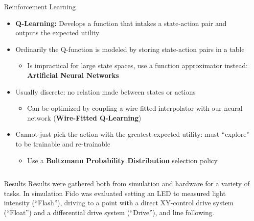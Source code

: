 \documentclass[final]{beamer}
\newlength{\onecolwid}
\newlength{\twocolwid}
\begin{document}
\begin{frame}[t]
\begin{columns}[t]
\begin{column}{\twocolwid}
\begin{columns}[t,totalwidth=\twocolwid]
\begin{column}{\onecolwid}\begin{block}{Reinforcement Learning}
	\begin{itemize}
		\item \textbf{Q-Learning:} Develops a function that intakes a state-action pair and outputs the expected utility
		\item Ordinarily the Q-function is modeled by storing state-action pairs in a table
		\begin{itemize}
			\item Is impractical for large state spaces, use a function approximator instead: \textbf{Artificial Neural Networks}
		\end{itemize}
		\item Usually discrete: no relation made between states or actions
		\begin{itemize}
			\item Can be optimized by coupling a wire-fitted interpolator with our neural network (\textbf{Wire-Fitted Q-Learning})
		\end{itemize}
		\item Cannot just pick the action with the greatest expected utility: must ``explore'' to be trainable and re-trainable
		\begin{itemize}
			\item Use a \textbf{Boltzmann Probability Distribution} selection policy
		\end{itemize}
	\end{itemize}


\end{block}\end{column} 

\end{columns} 

	\begin{block}{Results}
		Results were gathered both from simulation and hardware for a variety of tasks.  In simulation Fido was evaluated setting an LED  to measured light intensity (``Flash''), driving to a point with a direct XY-control drive system (``Float'') and a differential drive system (``Drive''), and line following.


\end{block}
\end{column}
\end{columns}
\end{frame}
\end{document}
